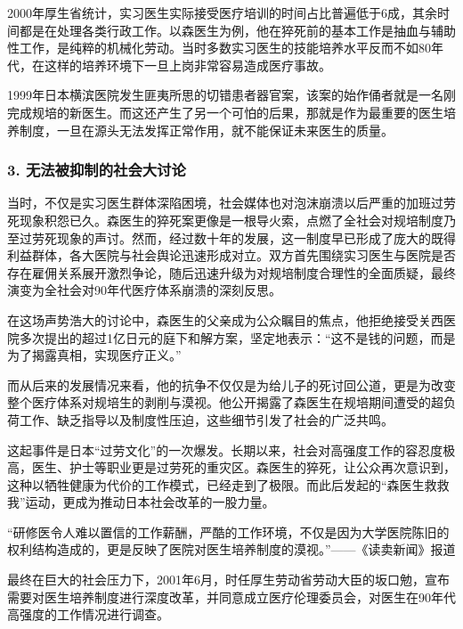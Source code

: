 {\fangsong 2000年厚生省统计，实习医生实际接受医疗培训的时间占比普遍低于6成，其余时间都是在处理各类行政工作。以森医生为例，他在猝死前的基本工作是抽血与辅助性工作，是纯粹的机械化劳动。当时多数实习医生的技能培养水平反而不如80年代，在这样的培养环境下一旦上岗非常容易造成医疗事故。\par}

{\fangsong 1999年日本横滨医院发生匪夷所思的切错患者器官案，该案的始作俑者就是一名刚完成规培的新医生。而这还产生了另一个可怕的后果，那就是作为最重要的医生培养制度，一旦在源头无法发挥正常作用，就不能保证未来医生的质量。\par}

\subsubsection{3. 无法被抑制的社会大讨论}

{\fangsong 当时，不仅是实习医生群体深陷困境，社会媒体也对泡沫崩溃以后严重的加班过劳死现象积怨已久。森医生的猝死案更像是一根导火索，点燃了全社会对规培制度乃至过劳死现象的声讨。然而，经过数十年的发展，这一制度早已形成了庞大的既得利益群体，各大医院与社会舆论迅速形成对立。双方首先围绕实习医生与医院是否存在雇佣关系展开激烈争论，随后迅速升级为对规培制度合理性的全面质疑，最终演变为全社会对90年代医疗体系崩溃的深刻反思。\par}

{\fangsong 在这场声势浩大的讨论中，森医生的父亲成为公众瞩目的焦点，他拒绝接受关西医院多次提出的超过1亿日元的庭下和解方案，坚定地表示：“这不是钱的问题，而是为了揭露真相，实现医疗正义。”\par}

{\fangsong 而从后来的发展情况来看，他的抗争不仅仅是为给儿子的死讨回公道，更是为改变整个医疗体系对规培生的剥削与漠视。他公开揭露了森医生在规培期间遭受的超负荷工作、缺乏指导以及制度性压迫，这些细节引发了社会的广泛共鸣。\par}

{\fangsong 这起事件是日本“过劳文化”的一次爆发。长期以来，社会对高强度工作的容忍度极高，医生、护士等职业更是过劳死的重灾区。森医生的猝死，让公众再次意识到，这种以牺牲健康为代价的工作模式，已经走到了极限。而此后发起的“森医生救救我”运动，更成为推动日本社会改革的一股力量。\par}

{\fangsong “研修医令人难以置信的工作薪酬，严酷的工作环境，不仅是因为大学医院陈旧的权利结构造成的，更是反映了医院对医生培养制度的漠视。”——《读卖新闻》报道\par}

{\fangsong 最终在巨大的社会压力下，2001年6月，时任厚生劳动省劳动大臣的坂口勉，宣布需要对医生培养制度进行深度改革，并同意成立医疗伦理委员会，对医生在90年代高强度的工作情况进行调查。\par}

